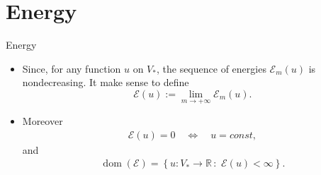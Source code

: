 \section{Energy}
\begin{frame}{Energy}
\begin{itemize}
\item Since, for any function $u$ on $V_*$, the sequence of energies $\mathcal{E}_{m}(u)$ is nondecreasing. It make sense to define 
$$
\mathcal{E}(u):=\lim_{m\rightarrow +\infty}\mathcal{E}_{m}(u).
$$

\item Moreover 
\begin{align}\label{when energy vanish}
\mathcal{E}(u)=0 \quad \Leftrightarrow \quad u=const, 
\end{align}
and 
\begin{align}\label{dom energy}
\operatorname{dom}(\mathcal{E})=\left\{ u:V_*\rightarrow \mathbb{R}\,:\,\, \mathcal{E}(u)<\infty \right\}.
\end{align}
\end{itemize}
\end{frame}
